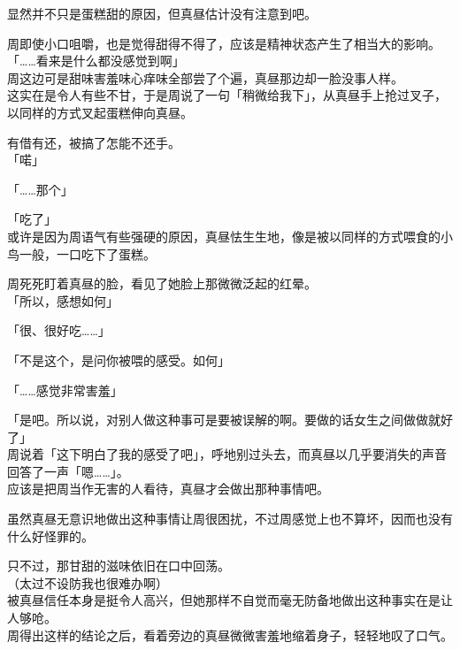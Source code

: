 显然并不只是蛋糕甜的原因，但真昼估计没有注意到吧。

周即使小口咀嚼，也是觉得甜得不得了，应该是精神状态产生了相当大的影响。\\

「……看来是什么都没感觉到啊」\\

周这边可是甜味害羞味心痒味全部尝了个遍，真昼那边却一脸没事人样。\\

这实在是令人有些不甘，于是周说了一句「稍微给我下」，从真昼手上抢过叉子，以同样的方式叉起蛋糕伸向真昼。

有借有还，被搞了怎能不还手。\\

「喏」

「……那个」

「吃了」\\

或许是因为周语气有些强硬的原因，真昼怯生生地，像是被以同样的方式喂食的小鸟一般，一口吃下了蛋糕。

周死死盯着真昼的脸，看见了她脸上那微微泛起的红晕。\\

「所以，感想如何」

「很、很好吃……」

「不是这个，是问你被喂的感受。如何」

「……感觉非常害羞」

「是吧。所以说，对别人做这种事可是要被误解的啊。要做的话女生之间做做就好了」\\

周说着「这下明白了我的感受了吧」，呼地别过头去，而真昼以几乎要消失的声音回答了一声「嗯……」。\\

应该是把周当作无害的人看待，真昼才会做出那种事情吧。

虽然真昼无意识地做出这种事情让周很困扰，不过周感觉上也不算坏，因而也没有什么好怪罪的。

只不过，那甘甜的滋味依旧在口中回荡。\\

（太过不设防我也很难办啊）\\

被真昼信任本身是挺令人高兴，但她那样不自觉而毫无防备地做出这种事实在是让人够呛。\\

周得出这样的结论之后，看着旁边的真昼微微害羞地缩着身子，轻轻地叹了口气。
